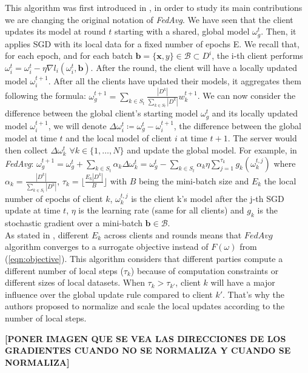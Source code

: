 This algorithm was first introduced in \cite*{wang2020}, in order to study its main contributions we are changing the original notation of \textit{FedAvg}. We have seen that the client updates its model at round $t$ starting with a shared, global model $\omega_g^t$. Then, it applies SGD with its local data for a fixed number of epochs E.
We recall that, for each epoch, and for each batch $\mathbf{b} = \{\mathbf{x}, y\} \in \mathcal{B} \subset D^i$, the i-th client performs $\omega_i^t = \omega_i^t - \eta \nabla l_i(\omega_i^t, \mathbf{b})$. After the round, the client will have a locally updated model $\omega_i^{t+1}$. After all the clients have updated their models, it aggregates them following the formula: $\omega_g^{t+1} = \sum_{k \in S_t} \frac{|D^k|}{\sum_{k\in S_t} |D^k|} w_k^{t+1}$.
We can now consider the difference between the global client's starting model $\omega_g^t$ and its locally updated model $\omega_i^{t+1}$, we will denote $\Delta \omega_i^t \coloneqq \omega_g^t - \omega_i^{t+1}$, the difference between the global model at time $t$ and the local model of client $i$ at time $t+1$.
The server would then collect $\Delta \omega_k^t$ $\forall k \in \{1,\dots, N\}$ and update the global model. For example, in \textit{FedAvg}: $\omega_g^{t+1} = \omega_g^t + \sum_{k \in S_t} \alpha_k \Delta \omega_k^t = \omega_g^t - \sum_{k \in S_t} \alpha_k \eta \sum_{j=1}^{\tau_k} g_k(\omega_k^{t, j})$ where $\alpha_k = \frac{|D^k|}{\sum_{k\in S_t} |D^k|}$, $\tau_k = \lfloor \frac{E_k |D^k|}{B} \rfloor$ with $B$ being the mini-batch size and $E_k$ the local number of epochs of client $k$, $\omega_k^{t,j}$ is the client k's model after the j-th SGD update at time $t$, $\eta$ is the learning rate (same for all clients) and $g_k$ is the stochastic gradient over a mini-batch $\mathbf{b} \in \mathcal{B}$.\\
As stated in \cite*{wang2020}, different $E_k$ across clients and rounds means that $FedAvg$ algorithm converges to a surrogate objective instead of $F(\omega)$ from (\ref{eqn:objective}).
This algorithm considers that different parties compute a different number of local steps ($\tau_k$) because of computation constraints or different sizes of local datasets. When $\tau_{k} > \tau_{k'}$, client $k$ will have a major influence over the global update rule compared to client $k'$. That's why the authors proposed to normalize and scale the local updates according to the number of local steps.

\textbf{[PONER IMAGEN QUE SE VEA LAS DIRECCIONES DE LOS GRADIENTES CUANDO NO SE NORMALIZA Y CUANDO SE NORMALIZA]}

